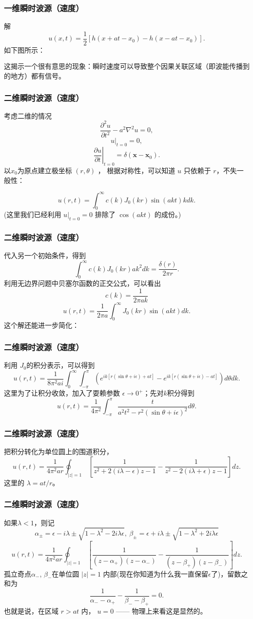 \documentclass[CJK]{beamer}
\begin{document}
\begin{frame}
  \frametitle{一维瞬时波源（速度）}
  解
  $$ u(x,t) = \frac{1}{2}\left[h(x+at-x_0) - h(x-at-x_0)\right].$$
  如下图所示：
  

  这揭示一个很有意思的现象：瞬时速度可以导致整个因果关联区域（即波能传播到的地方）都有信号。
\end{frame}


\begin{frame}
  \frametitle{二维瞬时波源（速度）}
  考虑二维的情况
  $$\frac{\partial^2u}{\partial t^2}-a^2\nabla^2 u = 0, $$
  $$\left. u\right\vert_{t=0} = 0,$$
  $$\left. \frac{\partial u}{\partial t}\right\vert_{t=0} = \delta(\mathbf{x}-\mathbf{x}_0).$$  
  以$x_0$为原点建立极坐标 $(r,\theta)$ ， 根据对称性，可以知道 $u$ 只依赖于 $r$，不失一般性：

  $$ u(r,t) = \int_0^\infty  c(k) J_0(kr)\sin(akt) k dk.  $$
  (这里我们已经利用 $u|_{t=0}=0$ 排除了 $\cos(akt)$ 的成份。)
\end{frame}


\begin{frame}
  \frametitle{二维瞬时波源（速度）}
  代入另一个初始条件，得到
  $$ \int_0^\infty  c(k) J_0(kr) ak^2 dk = \frac{\delta(r)}{2\pi r}.  $$
  利用无边界问题中贝塞尔函数的正交公式，可以看出
  $$ c(k) = \frac{1}{2\pi ak} $$
  $$ u(r,t) = \frac{1}{2\pi a} \int_0^\infty  J_0(kr) \sin(akt)  dk.  $$
  这个解还能进一步简化：
\end{frame}


\begin{frame}
  \frametitle{二维瞬时波源（速度）}
  利用 $J_0$的积分表示，可以得到
  $$ u(r,t) = \frac{1}{8\pi^2ai} \int_0^\infty  \int_{-\pi}^{\pi} \left(e^{ik[r(\sin\theta+i\epsilon)+at]}- e^{ik[r(\sin\theta+i\epsilon)-at]}\right)d\theta dk.  $$
  这里为了让积分收敛，加入了耍赖参数 $\epsilon\rightarrow 0^+$；先对$k$积分得到
  $$ u(r,t) = \frac{1}{4\pi^2}\int_{-\pi}^{\pi} \frac{t}{a^2t^2-r^2(\sin\theta + i\epsilon)^2 } d\theta.$$
\end{frame}

\begin{frame}
  \frametitle{二维瞬时波源（速度）}
  把积分转化为单位圆上的围道积分，
  $$ u(r,t) = \frac{1}{4\pi^2ar}\oint_{|z|=1}\ \left[\frac{1}{z^2 +2(i\lambda-\epsilon)z - 1}-\frac{1}{z^2 -2(i\lambda+\epsilon)z - 1 } \right]dz.$$
  这里的 $\lambda = at/r$。

\end{frame}


\begin{frame}
  \frametitle{二维瞬时波源（速度）}
  如果$\lambda< 1$，则记 $$\alpha_{\pm} = \epsilon-i\lambda \pm \sqrt{1-\lambda^2-2i\lambda \epsilon},\ \beta_{\pm} = \epsilon+i\lambda \pm \sqrt{1-\lambda^2 + 2i\lambda\epsilon}$$
  $$ u(r,t) = \frac{1}{4\pi^2ar}\oint_{|z|=1}\ \left[\frac{1}{(z-\alpha_+)(z-\alpha_-)}-\frac{1}{(z-\beta_+)(z-\beta_-)}\right]dz.$$
  孤立奇点$\alpha_-$, $\beta_-$在单位圆 $|z|=1$ 内部(现在你知道为什么我一直保留$\epsilon$了)，留数之和为
  $$\frac{1}{\alpha_--\alpha_+}-\frac{1}{\beta_--\beta_+} = 0. $$
  也就是说，在区域 $r> at$ 内， $u = 0$ —— 物理上来看这是显然的。
\end{frame}
\end{document}
